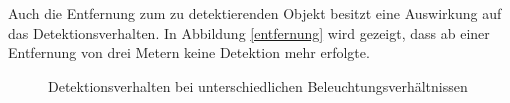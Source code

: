 Auch die Entfernung zum zu detektierenden Objekt besitzt eine Auswirkung auf das Detektionsverhalten. In Abbildung \ref{entfernung} wird gezeigt, dass ab einer Entfernung von drei Metern keine Detektion mehr erfolgte. 

\begin{figure}[ht]
	\hfill
	\hfill
	\hfill
	\caption{Detektionsverhalten bei unterschiedlichen Beleuchtungsverhältnissen}
	\label{sicht}
\end{figure}


